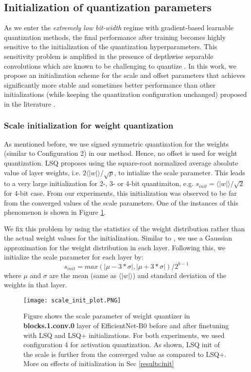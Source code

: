 \documentclass[10pt,twocolumn,letterpaper]{article}
\begin{document}
\subsection{Initialization of quantization parameters}
\label{sec:init}
As we enter the \textit{extremely low bit-width} regime with gradient-based learnable quantization methods, the final performance after training becomes highly sensitive to the initialization of the quantization hyperparameters. This sensitivity problem is amplified in the presence of depthwise separable convolutions which are known to be challenging to quantize \cite{haq}. In this work, we propose an initialization scheme for the scale and offset parameters that achieves significantly more stable and sometimes better performance than other initializations (while keeping the quantization configuration unchanged) proposed in the literature \cite{jacob2018cvpr, lsq}.


\subsubsection{Scale initialization for weight quantization} As mentioned before, we use signed symmetric quantization for the weights (similar to Configuration 2) in our method. Hence, no offset is used for weight quantization. LSQ \cite{lsq} proposes using the square-root normalized average absolute value of layer weights, i.e. $2\langle |w| \rangle/\sqrt{p}$, to intialize the scale parameter. This leads to a very large initialization for 2-, 3- or 4-bit quantizaiton, e.g. $s_{init}=\langle |w|\rangle/\sqrt{2}$ for 4-bit case. From our experiments, this initialization was observed to be far from the converged values of the scale parameters. One of the instances of this phenomenon is shown in Figure \ref{fig:scale_init}.



We fix this problem by using the statistics of the weight distribution rather than the actual weight values for the initialization. Similar to \cite{dfq}, we use a Gaussian approximation for the weight distribution in each layer. Following this, we initialize the scale parameter for each layer by:
$$s_{init} = max(|\mu-3*\sigma|, |\mu+3*\sigma|)/2^{b-1}$$
where $\mu$ and $\sigma$ are the mean (same as $\langle|w|\rangle$) and standard deviation of the weights in that layer.

\begin{figure}
    \centering
    \texttt{[image: scale\_init\_plot.PNG]}
    \caption{Figure shows the scale parameter of weight quantizer in \textbf{blocks.1.conv.0} layer of EfficientNet-B0 before and after finetuning with LSQ and LSQ+ initializations. For both experiments, we used configuration 4 for activation quantization. As shown, LSQ init of the scale is further from the converged value as compared to LSQ+. More on effects of initialization in Sec \ref{results:init}}
    \label{fig:scale_init}
\end{figure}
\end{document}
